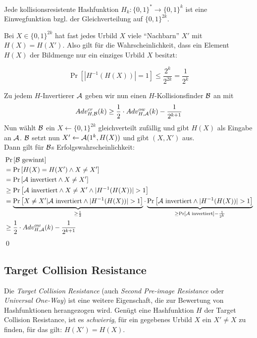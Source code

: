 \begin{theorem}
Jede kollisionsresistente Hashfunktion $H_k \colon \{0,1\}^* \rightarrow \{0,1\}^k$ ist eine Einwegfunktion bzgl. der Gleichverteilung auf $\{0,1\}^{2k}$.
\end{theorem}

\begin{beweisidee}
Bei $X \in \{0,1\}^{2k}$ hat fast jedes Urbild $X$ viele "`Nachbarn"' $X'$ mit $H(X) = H(X')$. Also gilt für die Wahrscheinlichkeit, dass ein Element $H(X)$
der Bildmenge nur ein einziges Urbild $X$ besitzt:

\begin{equation*}
\Pr \left[ | H^{-1}(H(X))| = 1\right] \leq \frac{2^k}{2^{2k}} = \frac{1}{2^k}
\end{equation*}
\end{beweisidee}

\begin{beweis}
Zu jedem $H$-Invertierer $\mathcal{A}$ geben wir nun einen $H$-Kollisionsfinder $\mathcal{B}$ an mit
\begin{equation*}
Adv^{cr}_{H,\mathcal{B}}(k) \geq \frac{1}{2} \cdot Adv^{ow}_{H,\mathcal{A}}(k) - \frac{1}{2^{k+1}}
\end{equation*} 
Nun wählt $\mathcal{B}$ ein $X \leftarrow \{0,1\}^{2k}$ gleichverteilt zufällig und gibt $H(X)$ als Eingabe an $\mathcal{A}$. $\mathcal{B}$ setzt nun $X' \leftarrow \mathcal{A}(1^k, H(X))$ und
gibt $(X, X')$ aus.\\
Dann gilt für $\mathcal{B}$s Erfolgswahrscheinlichkeit:
\begin{align*}
&\Pr \left[\mathcal{B} \text{ gewinnt}\right]\\
& = \Pr\left[H(X) = H(X') \land X \not = X'\right]\\
&= \Pr \left[\mathcal{A} \text{ invertiert} \land X \not = X'\right]\\
&\geq \Pr \left[\mathcal{A} \text{ invertiert} \land X \not = X' \land |H^{-1}(H(X))| > 1\right]\\
&= \underbrace{\Pr \left[X \not = X' | \mathcal{A} \text{ invertiert} \land | H^{-1}(H(X))| > 1\right]}_{\geq \frac{1}{2}}
\cdot \underbrace{\Pr \left[\mathcal{A} \text{ invertiert} \land| H^{-1}(H(X))| > 1\right]}_{\geq \Pr \left[\mathcal{A} \text{ invertiert}\right] - \frac{1}{2^k}}\\
&\geq \frac{1}{2} \cdot Adv^{ow}_{H,\mathcal{A}}(k) - \frac{1}{2^{k+1}}
\end{align*}
\qed
\end{beweis}


\subsection{Target Collision Resistance}
Die \textit{Target Collision Resistance} (auch \textit{Second Pre-image Resistance} oder \textit{Universal One-Way}) ist eine weitere Eigenschaft, die zur
Bewertung von Hashfunktionen herangezogen wird. Genügt eine Hashfunktion $H$ der Target Collision Resistance, ist es \textit{schwierig}, für ein gegebenes
Urbild $X$ ein $X' \not = X$ zu finden, für das gilt: $H(X') = H(X)$.

